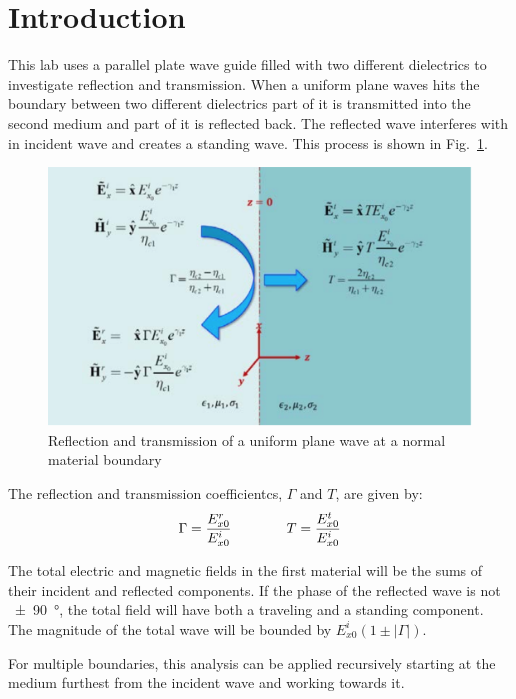 \section{Introduction}\label{sec:intro}
This lab uses a parallel plate wave guide filled with two different dielectrics to investigate reflection and transmission.
When a uniform plane waves hits the boundary between two different dielectrics part of it is transmitted into the second medium and part of it is reflected back.
The reflected wave interferes with in incident wave and creates a standing wave.
This process is shown in Fig.~\ref{fig:ref_and_trans}.

\begin{figure}[tbph]
	\centering
	\includegraphics[width=0.7\linewidth]{graphics/ref_and_trans}
	\caption{Reflection and transmission of a uniform plane wave at a normal material boundary}
	\label{fig:ref_and_trans}
\end{figure}

The reflection and transmission coefficientcs, $\Gamma$ and $T$, are given by:
\begin{equation}\label{eqn:coefs}
	\Gamma = { E_{x0}^r \over E_{x0}^i } \qquad\qquad T = { E_{x0}^t \over E_{x0}^i }
\end{equation}

The total electric and magnetic fields in the first material will be the sums of their incident and reflected components.
If the phase of the reflected wave is not \SI{+-90}{\degree}, the total field will have both a traveling and a standing component.
The magnitude of the total wave will be bounded by $E_{x0}^i\left(1 \pm \left|\Gamma\right|\right)$.

For multiple boundaries, this analysis can be applied recursively starting at the medium furthest from the incident wave and working towards it.
